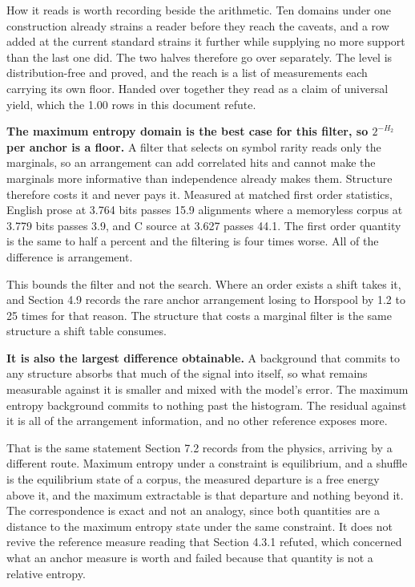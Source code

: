 How it reads is worth recording beside the arithmetic. Ten domains under one construction already strains a reader before they reach the caveats, and a row added at the current standard strains it further while supplying no more support than the last one did. The two halves therefore go over separately. The level is distribution-free and proved, and the reach is a list of measurements each carrying its own floor. Handed over together they read as a claim of universal yield, which the 1.00 rows in this document refute.

\textbf{The maximum entropy domain is the best case for this filter, so \(2^{-H_2}\) per anchor is a floor.} A filter that selects on symbol rarity reads only the marginals, so an arrangement can add correlated hits and cannot make the marginals more informative than independence already makes them. Structure therefore costs it and never pays it. Measured at matched first order statistics, English prose at 3.764 bits passes 15.9 alignments where a memoryless corpus at 3.779 bits passes 3.9, and C source at 3.627 passes 44.1. The first order quantity is the same to half a percent and the filtering is four times worse. All of the difference is arrangement.

This bounds the filter and not the search. Where an order exists a shift takes it, and Section 4.9 records the rare anchor arrangement losing to Horspool by 1.2 to 25 times for that reason. The structure that costs a marginal filter is the same structure a shift table consumes.

\textbf{It is also the largest difference obtainable.} A background that commits to any structure absorbs that much of the signal into itself, so what remains measurable against it is smaller and mixed with the model's error. The maximum entropy background commits to nothing past the histogram. The residual against it is all of the arrangement information, and no other reference exposes more.

That is the same statement Section 7.2 records from the physics, arriving by a different route. Maximum entropy under a constraint is equilibrium, and a shuffle is the equilibrium state of a corpus, the measured departure is a free energy above it, and the maximum extractable is that departure and nothing beyond it. The correspondence is exact and not an analogy, since both quantities are a distance to the maximum entropy state under the same constraint. It does not revive the reference measure reading that Section 4.3.1 refuted, which concerned what an anchor measure is worth and failed because that quantity is not a relative entropy.

